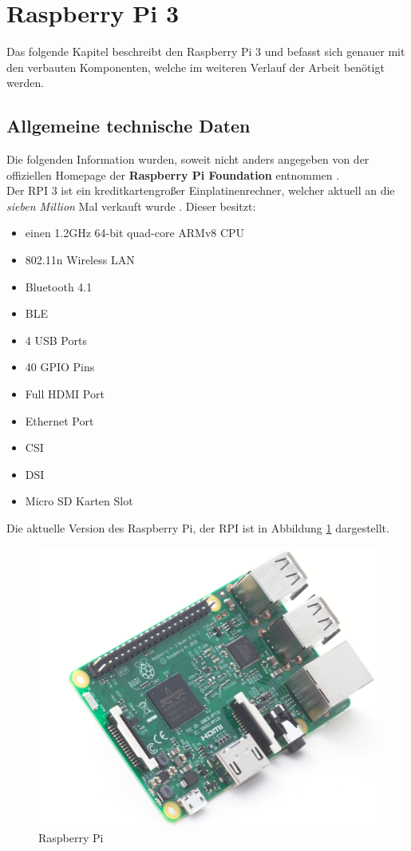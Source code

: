 \section{Raspberry Pi 3}
\label{section_Raspberry_Pi3}
Das folgende Kapitel beschreibt den Raspberry Pi 3 und befasst sich genauer mit den verbauten Komponenten, welche im weiteren Verlauf der Arbeit benötigt werden. 

\subsection{Allgemeine technische Daten}
\label{subsection_Allgemeine_technische_Daten}
Die folgenden Information wurden, soweit nicht anders angegeben von der offiziellen Homepage der \textbf{Raspberry Pi Foundation} entnommen \citep{RaspberryPiHomePage}.\\
Der \ac{RPI} 3 ist ein kreditkartengroßer Einplatinenrechner, welcher aktuell an die \textit{sieben Million} Mal verkauft wurde \citep{RPI_Verkaufszahlen}. Dieser besitzt:
\begin{itemize}
\item einen 1.2\;GHz 64-bit quad-core ARMv8 CPU
\item 802.11n Wireless LAN
\item Bluetooth 4.1
\item \ac{BLE}
\item 4 USB Ports
\item 40 GPIO Pins
\item Full HDMI Port
\item Ethernet Port
\item \ac{CSI}
\item \ac{DSI}
\item Micro SD Karten Slot
\end{itemize}

Die aktuelle Version des Raspberry Pi, der \ac{RPI} ist in Abbildung \ref{Abb_Bild_RPI3} dargestellt.

\begin{figure}[!h] 
  \centering
     \includegraphics[scale=.4]{BilderAllgemein/RPI3.png}
  \caption{Raspberry Pi \citep{RPI_Bild}}
  \label{Abb_Bild_RPI3}
\end{figure}

